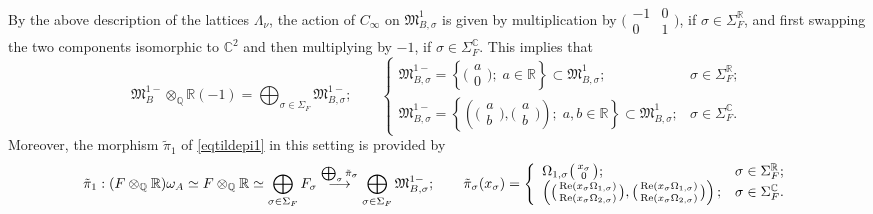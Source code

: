 \documentclass{amsart}
\theoremstyle{definition}
\theoremstyle{remark}
\numberwithin{equation}{section}
\newcommand{\mfM}{{\mathfrak M}}
\newcommand{\Q}{{\mathbb Q}}
\newcommand{\C}{{\mathbb C}}
\newcommand{\R}{{\mathbb R}}
\begin{document}
    By the above description of the lattices $\Lambda_\nu$, the action of $C_\infty$  on $\mfM^1_{B,\sigma}$ is given by multiplication by $\big(\begin{smallmatrix}
        -1&0\\0&1
    \end{smallmatrix}\big)$, if $\sigma\in\Sigma_F^\R$, and first swapping the two components isomorphic to $\C^2$ and then multiplying by $-1$, if $\sigma\in\Sigma_F^\C$. This implies that 
    \[
   \mfM^{1-}_B\otimes_\Q \R(-1)=\bigoplus_{\sigma\in\Sigma_F}\mfM^{1-}_{B,\sigma};\qquad \left\{\begin{array}{ll}
        \mfM^{1-}_{B,\sigma}=\left\{\big(\begin{smallmatrix}a\\ 0\end{smallmatrix}\big);\;a\in\R\right\}\subset \mfM^{1}_{B,\sigma}; &\sigma\in\Sigma_F^\R;  \\
         \mfM^{1-}_{B,\sigma}=\left\{\left(\big(\begin{smallmatrix}a\\ b\end{smallmatrix}\big),\big(\begin{smallmatrix}a\\ b\end{smallmatrix}\big)\right);\;a,b\in\R\right\}\subset \mfM^{1}_{B,\sigma};& \sigma\in\Sigma_F^\C.
    \end{array}\right.
    \]
    Moreover, the morphism $\tilde\pi_1$ of \eqref{eqtildepi1} in this setting is provided by
    \[
    \tilde \pi_1:(F\otimes_\Q\R)\omega_A\simeq F\otimes_\Q\R\simeq \bigoplus_{\sigma\in\Sigma_F}F_\sigma\stackrel{\bigoplus_\sigma\tilde\pi_\sigma}{\longrightarrow} \bigoplus_{\sigma\in\Sigma_F}\mfM^{1-}_{B,\sigma};\qquad \tilde\pi_\sigma(x_\sigma)=\left\{\begin{array}{ll}
         \Omega_{1,\sigma}\big(\begin{smallmatrix}x_\sigma\\ 0\end{smallmatrix}\big); &\sigma\in\Sigma_F^\R;  \\
        \left(\big(\begin{smallmatrix}{\rm Re}(x_\sigma\Omega_{1,\sigma})\\ {\rm Re}(x_\sigma\Omega_{2,\sigma})\end{smallmatrix}\big),\big(\begin{smallmatrix}{\rm Re}(x_\sigma\Omega_{1,\sigma})\\ {\rm Re}(x_\sigma\Omega_{2,\sigma})\end{smallmatrix}\big)\right);& \sigma\in\Sigma_F^\C.
    \end{array}\right.
    \]
\end{document}
